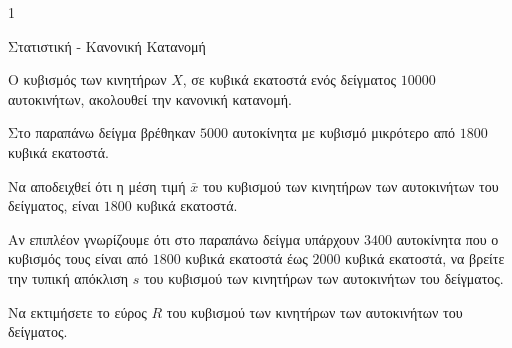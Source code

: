 \begin{ylh}{1}
    \item Στατιστική - Κανονική Κατανομή
\end{ylh}
Ο κυβισμός των κινητήρων $X$, σε κυβικά εκατοστά ενός δείγματος $10000$ αυτοκινήτων, ακολουθεί την κανονική κατανομή.

Στο παραπάνω δείγμα βρέθηκαν $5000$ αυτοκίνητα με κυβισμό μικρότερο από $1800$ κυβικά εκατοστά.
\begin{alist}
    \item Να αποδειχθεί ότι η μέση τιμή $\bar{x}$ του κυβισμού των κινητήρων των αυτοκινήτων του δείγματος, είναι $1800$ κυβικά εκατοστά. 
    \item Αν επιπλέον γνωρίζουμε ότι στο παραπάνω δείγμα υπάρχουν $3400$ αυτοκίνητα που ο κυβισμός τους είναι από $1800$ κυβικά εκατοστά έως $2000$ κυβικά εκατοστά, να βρείτε την τυπική απόκλιση $s$ του κυβισμού των κινητήρων των αυτοκινήτων του δείγματος. 
    \item Να εκτιμήσετε το εύρος $R$ του κυβισμού των κινητήρων των αυτοκινήτων του δείγματος. 
\end{alist}

